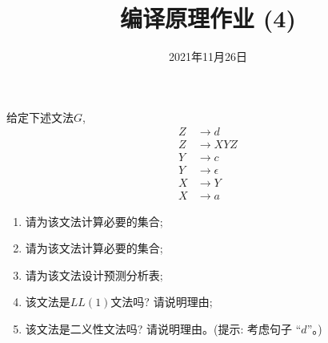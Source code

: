 \documentclass[a4paper, justified]{tufte-handout}
\title{编译原理作业 (4)}
\date{2021年11月26日}
\begin{document}
\maketitle
\noplagiarism %
\begin{abstract}
\end{abstract}
\beginrequired

\begin{problem}[\score{10 = 3 + 3 + 2 + 1 + 1}]
  给定下述文法$G$,
  \begin{align}
    Z &\to d \\[8pt]
    Z &\to XYZ \\[8pt]
    Y &\to c \\[8pt]
    Y &\to \epsilon \\[8pt]
    X &\to Y \\[8pt]
    X &\to a
  \end{align}

  \begin{enumerate}[(1)]
    \item 请为该文法计算必要的\first{}集合;
    \item 请为该文法计算必要的\follow{}集合;
    \item 请为该文法设计预测分析表;
    \item 该文法是$LL(1)$文法吗? 请说明理由;
    \item 该文法是二义性文法吗? 请说明理由。({提示: 考虑句子 ``$d$''}。)
  \end{enumerate}
\end{problem}
\end{document}
